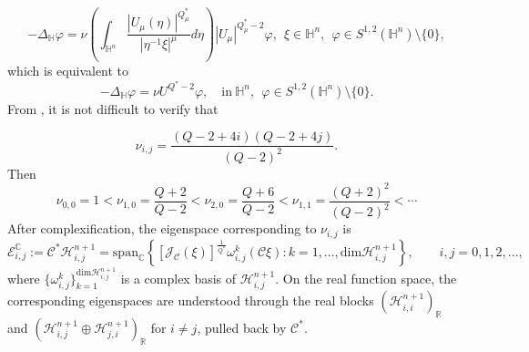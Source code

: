 \documentclass[10pt,a4paper]{amsart}
\begin{document}
\begin{equation*}
 -\Delta_{\mathbb{H}} \varphi=\nu\left(\int_{\mathbb{H}^{n}}\frac{|U_\mu(\eta)|
^{Q^{\ast}_{\mu}}}{|\eta^{-1}\xi|^{\mu}}{d}\eta\right)|U_\mu|^{Q^{\ast}_{\mu}-2}\varphi,~~\xi\in\mathbb{H}^{n},~~\varphi\in S^{1,2}(\mathbb{H}^{n})\setminus \{0\},
\end{equation*}
which is equivalent to
\begin{equation*}
 -\Delta_{\mathbb{H}} \varphi=\nu U^{Q^{\ast}-2}\varphi,\quad\mathrm{in}~\mathbb{H}^{n},~~\varphi\in S^{1,2}(\mathbb{H}^{n})\setminus \{0\}.
\end{equation*}
From \cite[Section 5.4]{FL12}, it is not difficult to verify that

\begin{equation*}
  \nu_{i,j}=\frac{(Q-2+4i)(Q-2+4j)}{(Q-2)^2}.
\end{equation*}
Then
\begin{equation}\label{eig1}
 \nu_{0,0}=1<\nu_{1,0}=\frac{Q+2}{Q-2}<\nu_{2,0}=\frac{Q+6}{Q-2}<\nu_{1,1}=\frac{(Q+2)^2}{(Q-2)^2}<\cdots
\end{equation}
{After complexification, the eigenspace corresponding to $\nu_{i,j}$ is
\begin{equation*}
 \mathcal E_{i,j}^{\mathbb C}:=\mathcal C^*\mathcal H_{i,j}^{n+1}
 =\mathrm{span}_{\mathbb C}\left\{[\mathcal{J}_\mathcal{C}(\xi)]^{\frac{1}{Q^{\ast}}}\omega_{i,j}^k(\mathcal{C}\xi):
 k=1,\ldots,\mathrm{dim}\mathcal H_{i,j}^{n+1}\right\},
 \qquad i,j=0,1,2,\ldots,
\end{equation*}
where $\{\omega_{i,j}^k\}_{k=1}^{\mathrm{dim}\mathcal H_{i,j}^{n+1}}$ is a complex basis of $\mathcal H_{i,j}^{n+1}$. On the real function space, the corresponding eigenspaces are understood through the real blocks $(\mathcal H_{i,i}^{n+1})_{\mathbb R}$ and $(\mathcal H_{i,j}^{n+1}\oplus\mathcal H_{j,i}^{n+1})_{\mathbb R}$ for $i\ne j$, pulled back by $\mathcal C^*$.}
\end{document}
